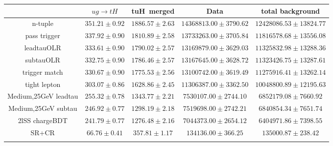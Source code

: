 \centering
\begin{tabular}{ccccc} \toprule\toprule
 & $ug\to tH$ & tuH~merged & Data & total background\\\midrule
n-tuple & $351.21\pm0.92$ & $1886.57\pm2.63$ & $14368813.00\pm3790.62$ & $12428086.53\pm13824.77$\\
pass trigger & $337.92\pm0.90$ & $1810.89\pm2.58$ & $13733263.00\pm3705.84$ & $11816578.68\pm13556.08$\\
leadtauOLR & $333.61\pm0.90$ & $1790.02\pm2.57$ & $13169879.00\pm3629.03$ & $11325832.98\pm13288.36$\\
subtauOLR & $332.75\pm0.90$ & $1786.46\pm2.57$ & $13167645.00\pm3628.72$ & $11323426.75\pm13287.61$\\
trigger match & $330.67\pm0.90$ & $1775.53\pm2.56$ & $13100742.00\pm3619.49$ & $11275916.41\pm13262.14$\\
tight lepton & $303.07\pm0.86$ & $1628.86\pm2.45$ & $11306387.00\pm3362.50$ & $10048800.89\pm12195.63$\\
Medium,25GeV leadtau & $255.32\pm0.78$ & $1343.77\pm2.21$ & $7530107.00\pm2744.10$ & $6852179.08\pm7660.92$\\
Medium,25GeV subtau & $246.92\pm0.77$ & $1298.19\pm2.18$ & $7519698.00\pm2742.21$ & $6840854.34\pm7651.74$\\
2lSS chargeBDT & $241.79\pm0.77$ & $1276.48\pm2.16$ & $7044373.00\pm2654.12$ & $6404971.86\pm7398.55$\\
SR+CR & $66.76\pm0.41$ & $357.81\pm1.17$ & $134136.00\pm366.25$ & $135000.87\pm238.42$\\
\bottomrule\bottomrule\\
\end{tabular}
